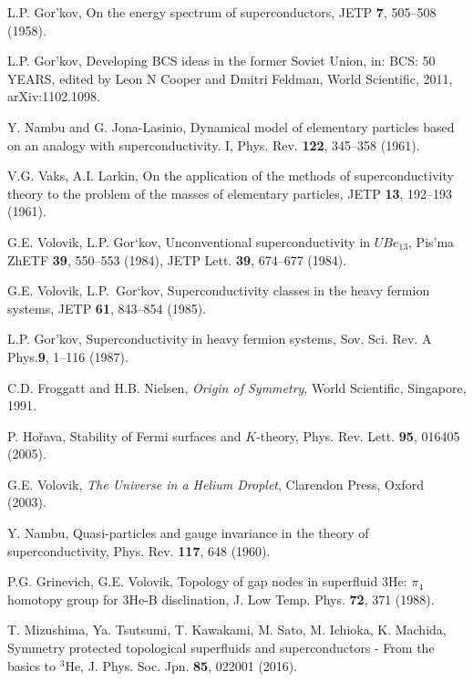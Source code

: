 \documentclass[prb,
superscriptaddress,showpacs,amsmath,amssymb]{revtex4}
\begin{document}
\begin{thebibliography}{99}


L.P. Gor'kov,  
On the energy spectrum of superconductors,
JETP {\bf 7}, 505--508 (1958).

L.P. Gor'kov,  
Developing BCS ideas in the former Soviet Union,
 in: BCS: 50 YEARS, edited by Leon N Cooper and Dmitri Feldman, World Scientific, 2011,
arXiv:1102.1098.

Y. Nambu and G. Jona-Lasinio, 
Dynamical model of elementary particles based on an analogy with superconductivity. I,
Phys. Rev. {\bf 122}, 345--358 (1961).

V.G. Vaks, A.I. Larkin,
 On the application of the methods of superconductivity theory to the problem of the masses of elementary particles, 
 JETP {\bf 13}, 192--193 (1961).

G.E. Volovik, L.P. Gor`kov, 
Unconventional  superconductivity in $UBe_{13}$,
Pis'ma ZhETF {\bf 39}, 550--553 (1984),
JETP Lett.  {\bf 39}, 674--677  (1984).

G.E. Volovik, L.P.~Gor`kov, 
Superconductivity classes in the heavy fermion systems,
JETP {\bf 61}, 843--854 (1985).

L.P. Gor’kov, 
Superconductivity in heavy fermion systems,
Sov. Sci. Rev. A Phys.{\bf 9}, 1--116 (1987).

C.D. Froggatt   and  H.B. Nielsen,
{\it Origin of Symmetry}, World Scientific, Singapore, 1991.

P. Ho\v{r}ava,
Stability of Fermi surfaces and $K$-theory,
Phys. Rev. Lett. \textbf{95}, 016405 (2005).

G.E. Volovik, 
{\it The Universe in a Helium Droplet}, 
Clarendon Press,  Oxford (2003).

Y. Nambu,
Quasi-particles and gauge invariance in the theory of superconductivity,
 Phys. Rev. {\bf 117}, 648 (1960).



 P.G. Grinevich, G.E. Volovik,
 Topology of gap nodes in superfluid  3He:  $\pi_4$ homotopy group for 3He-B  disclination,
J. Low Temp. Phys. {\bf 72}, 371  (1988).

 

T. Mizushima, Ya. Tsutsumi, T. Kawakami, M. Sato, M. Ichioka, K. Machida,
Symmetry protected topological superfluids and superconductors - From the basics to $^3$He,
J. Phys. Soc. Jpn. {\bf 85}, 022001 (2016).


\end{thebibliography}
\end{document}
